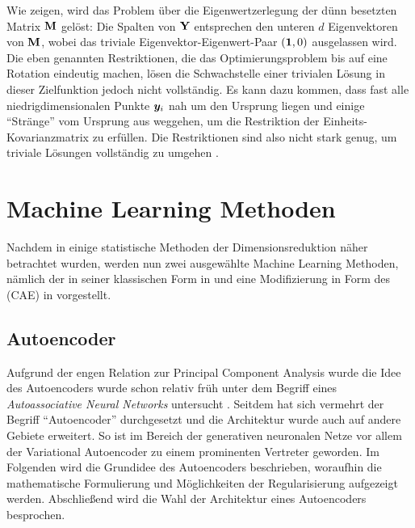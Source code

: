 Wie \textcite[3 -- 4]{Ghojogh.2020} zeigen, wird das Problem über die Eigenwertzerlegung der dünn
besetzten Matrix $\mathbf{M}$ gelöst: Die Spalten von $\mathbf{Y}$ entsprechen den unteren $d$
Eigenvektoren von $\mathbf{M}$, wobei das triviale Eigenvektor-Eigenwert-Paar $(\bm{1}, 0)$ ausgelassen
wird. Die eben genannten Restriktionen, die das Optimierungsproblem bis auf eine Rotation eindeutig
machen, lösen die Schwachstelle einer trivialen Lösung in dieser Zielfunktion jedoch nicht
vollständig. Es kann dazu kommen, dass fast alle niedrigdimensionalen Punkte $\bm{y}_i$ nah um
den Ursprung liegen und einige \enquote{Stränge} vom Ursprung aus weggehen, um die Restriktion der
Einheits-Kovarianzmatrix zu erfüllen. Die Restriktionen sind also nicht stark genug, um triviale
Lösungen vollständig zu umgehen \parencite[vgl.][23]{vanderMaaten.2009}.

\section{Machine Learning Methoden}
\label{ch:MethodenDerDimRed:modern}
Nachdem in  einige statistische Methoden der
Dimensionsreduktion näher betrachtet wurden, werden nun zwei ausgewählte Machine Learning Methoden,
nämlich der  in seiner klassischen Form in
 und eine Modifizierung in Form des  (CAE) in  vorgestellt.

\subsection{Autoencoder}
\label{ch:MethodenDerDimRed:ML:AE}

Aufgrund der engen Relation zur Principal Component Analysis wurde die Idee des Autoencoders wurde
schon relativ früh unter dem Begriff eines \textit{Autoassociative Neural Networks} untersucht \parencites{Kramer.1991}{Kramer.1992}{Bourlard.1988}. Seitdem hat sich vermehrt der Begriff
\enquote{Autoencoder} durchgesetzt und die Architektur wurde auch auf andere Gebiete erweitert. So
ist im Bereich der generativen neuronalen Netze vor allem der Variational Autoencoder \parencite{Kingma.2013} zu einem prominenten Vertreter geworden. Im Folgenden wird die Grundidee des
Autoencoders beschrieben, woraufhin die mathematische Formulierung und Möglichkeiten der
Regularisierung aufgezeigt werden. Abschließend wird die Wahl der Architektur eines Autoencoders
besprochen.

